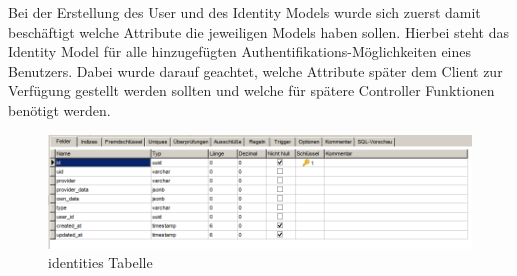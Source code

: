 

Bei der Erstellung des User und des Identity Models wurde sich zuerst damit beschäftigt welche Attribute die jeweiligen Models haben sollen. Hierbei steht das Identity Model für alle hinzugefügten Authentifikations-Möglichkeiten eines Benutzers. Dabei wurde darauf geachtet, welche Attribute später dem Client zur Verfügung gestellt werden sollten und welche für spätere Controller Funktionen benötigt werden.

\begin{figure}[h]
	\includegraphics[width=\textwidth]{graphics/identities_table.png}
	\caption{identities Tabelle}
	\label{fig:identities_table}
\end{figure}

